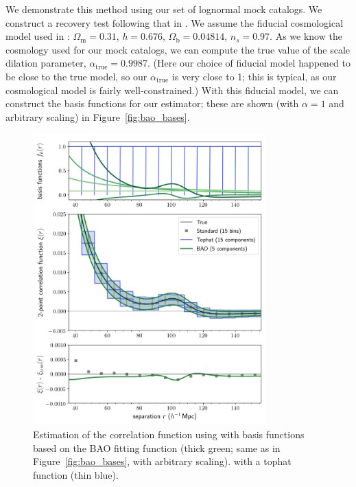 We demonstrate this method using our set of lognormal mock catalogs.
We construct a recovery test following that in \cite{Hinton2019}.
We assume the fiducial cosmological model used in \cite{Beutler2017}: $\Omega_{\text{m}} = 0.31$, $h = 0.676$, $\Omega_{\text{b}} = 0.04814$, $n_s = 0.97$. 
As we know the cosmology used for our mock catalogs, we can compute the true value of the scale dilation parameter, $\alpha_{\text{true}}=0.9987$.
(Here our choice of fiducial model happened to be close to the true model, so our $\alpha_{\text{true}}$ is very close to 1; this is typical, as our cosmological model is fairly well-constrained.)
With this fiducial model, we can construct the basis functions for our estimator; these are shown (with $\alpha=1$ and arbitrary scaling) in Figure~\ref{fig:bao_bases}.

\begin{figure}%
\centering
    \includegraphics[width=0.8\textwidth]{xicomparison_2e-4_tophat8_baoiter}
    \caption{Estimation of the correlation function using \est with basis functions based on the BAO fitting function (thick green; same as in Figure~\ref{fig:bao_bases}, with arbitrary scaling).  \est with a tophat function (thin blue). }
    \label{fig:bao}
\end{figure}

